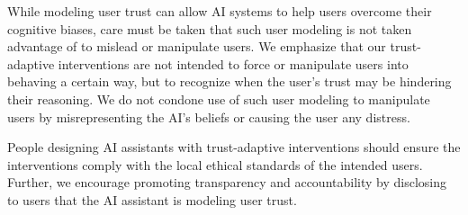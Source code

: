 While modeling user trust can allow AI systems to help users overcome their cognitive biases, care must be taken that such user modeling is not taken advantage of to mislead or manipulate users. 
We emphasize that our trust-adaptive interventions are not intended to force or manipulate users into behaving a certain way, but to recognize when the user's trust may be hindering their reasoning.
We do not condone use of such user modeling to manipulate users by misrepresenting the AI's beliefs or causing the user any distress. 

People designing AI assistants with trust-adaptive interventions should ensure the interventions comply with the local ethical standards of the intended users. 
Further, we encourage promoting transparency and accountability by disclosing to users that the AI assistant is modeling user trust.